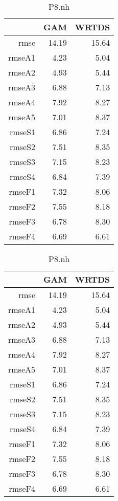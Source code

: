 \documentclass[12pt]{amsart}
\begin{document}
\begin{table}[H]
\centering
\begin{tabular}{rrr}
  \hline
 & GAM & WRTDS \\ 
  \hline
rmse & 14.19 & 15.64 \\ 
  rmseA1 & 4.23 & 5.04 \\ 
  rmseA2 & 4.93 & 5.44 \\ 
  rmseA3 & 6.88 & 7.13 \\ 
  rmseA4 & 7.92 & 8.27 \\ 
  rmseA5 & 7.01 & 8.37 \\ 
  rmseS1 & 6.86 & 7.24 \\ 
  rmseS2 & 7.51 & 8.35 \\ 
  rmseS3 & 7.15 & 8.23 \\ 
  rmseS4 & 6.84 & 7.39 \\ 
  rmseF1 & 7.32 & 8.06 \\ 
  rmseF2 & 7.55 & 8.18 \\ 
  rmseF3 & 6.78 & 8.30 \\ 
  rmseF4 & 6.69 & 6.61 \\ 
   \hline
\end{tabular}
\caption{P8.nh}
\end{table}

\begin{table}[H]
\centering
\begin{tabular}{rrr}
  \hline
 & GAM & WRTDS \\ 
  \hline
rmse & 14.19 & 15.64 \\ 
  rmseA1 & 4.23 & 5.04 \\ 
  rmseA2 & 4.93 & 5.44 \\ 
  rmseA3 & 6.88 & 7.13 \\ 
  rmseA4 & 7.92 & 8.27 \\ 
  rmseA5 & 7.01 & 8.37 \\ 
  rmseS1 & 6.86 & 7.24 \\ 
  rmseS2 & 7.51 & 8.35 \\ 
  rmseS3 & 7.15 & 8.23 \\ 
  rmseS4 & 6.84 & 7.39 \\ 
  rmseF1 & 7.32 & 8.06 \\ 
  rmseF2 & 7.55 & 8.18 \\ 
  rmseF3 & 6.78 & 8.30 \\ 
  rmseF4 & 6.69 & 6.61 \\ 
   \hline
\end{tabular}
\caption{P8.nh}
\end{table}
\end{document}

